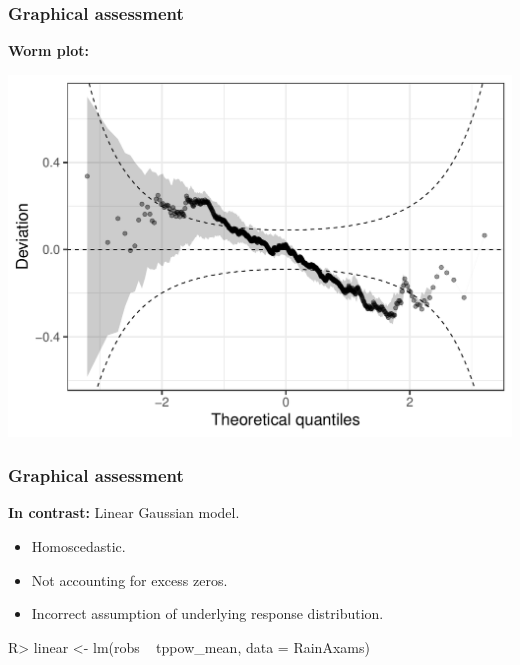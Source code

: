 \documentclass[11pt,t,usepdftitle=false,aspectratio=169]{beamer}
\begin{document}
\begin{frame}[fragile]
\frametitle{Graphical assessment}

\vspace{-0.75em}

\textbf{Worm plot:}  

\vspace{0.25em}

\begin{center}
\includegraphics{slides-rain_topmodels_df_wormplot}
\end{center}
\end{frame}


\begin{frame}[fragile]
\frametitle{Graphical assessment}

\vspace{-0.75em}

\textbf{In contrast:} Linear Gaussian model.

\begin{itemize}
  \item Homoscedastic.
  \item Not accounting for excess zeros.
  \item Incorrect assumption of underlying response distribution. 
\end{itemize}

\vspace{1em}

\begin{Schunk}
\begin{Sinput}
R> linear <- lm(robs ~ tppow_mean, data = RainAxams)
\end{Sinput}
\end{Schunk}

\end{frame}
\end{document}
